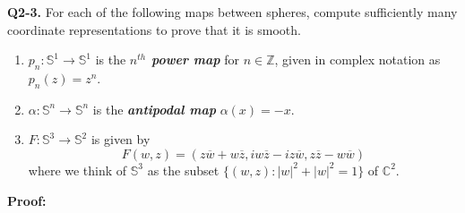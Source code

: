 \documentclass{article}
\newcommand{\C}{\mathbb{C}}
\begin{document}
\textbf{Q2-3.} For each of the following maps between spheres, compute sufficiently many coordinate representations to prove that it is smooth.
\begin{enumerate}[label=(\alph*)]
  \item $p_n : \mathbb{S}^1 \rightarrow \mathbb{S}^1$ is the \emph{\textbf{$n^{th}$ power map}} for $n \in \mathbb{Z}$, given in complex notation as $p_n(z) = z^n$.
  \item $\alpha : \mathbb{S}^n \rightarrow \mathbb{S}^n$ is the \emph{\textbf{antipodal map}} $\alpha(x) = -x$.
  \item $F : \mathbb{S}^3 \rightarrow \mathbb{S}^2$ is given by 
  \[ F(w, z) = (z \overline{w} + w\overline{z}, i w\overline{z} - iz\overline{w}, z\overline{z} - w \overline{w}) \] where we think of $\mathbb{S}^3$ as the subset $\{ (w, z) : \left| w \right|^2 + \left| w \right|^2 = 1 \}$ of $\C^2$.
\end{enumerate}

\vskip 0.5cm
\textbf{Proof:}
\end{document}
